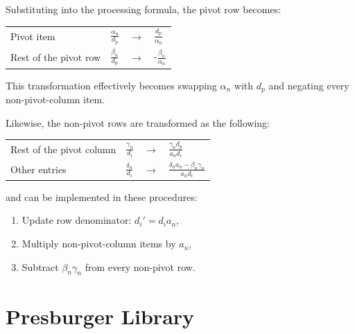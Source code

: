 \documentclass[logo,bsc,singlespacing,parskip]{infthesis}
\newenvironment{compactlist}
{ \begin{enumerate}
    \setlength{\itemsep}{0pt}
    \setlength{\parskip}{0pt}
    \setlength{\parsep}{0pt}     
}
{ \end{enumerate} }
\begin{document}
Substituting into the processing formula, the pivot row becomes:
\vspace*{-4mm}
\begin{table}[H]
\begin{center}
\begin{tabular}{llll}
Pivot item           & $\frac{\alpha_n}{d_p}$ & $\rightarrow$ & $\frac{d_p}{\alpha_n}$       \\
Rest of the pivot row    & $\frac{\beta_n}{d_p}$  & $\rightarrow$ & -$\frac{\beta_n}{\alpha_n}$  
\end{tabular}
\end{center}
\end{table}
\vspace*{-8mm}
This transformation effectively becomes swapping $\alpha_n$ with $d_p$ and
negating every non-pivot-column item. 

Likewise, the non-pivot rows are transformed as the following:
\vspace*{-4mm}
\begin{table}[H]
\begin{center}
\begin{tabular}{llll}
Rest of the pivot column& $\frac{\gamma_n}{d_i}$ & $\rightarrow$ & $\frac{\gamma_nd_p}{a_nd_i}$            \\
Other entries         & $\frac{\delta_n}{d_i}$    & $\rightarrow$ & $\frac{\delta_na_n-\beta_n\gamma_n}{a_nd_i}$  
\end{tabular}
\end{center}
\end{table}
\vspace*{-8mm}
and can be implemented in these procedures: 
\vspace*{-2.0mm}
\begin{compactlist}
    \item Update row denominator: $d_i' = d_ia_n$, 
    \item Multiply non-pivot-column items by $a_n$,
    \item Subtract $\beta_n\gamma_n$ from every non-pivot row.
\end{compactlist}

\section{Presburger Library}
\label{sec:presburger}
\end{document}
